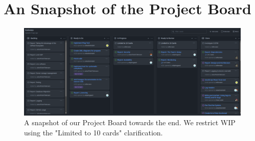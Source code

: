 \section{An Snapshot of the Project Board}
\label{app:kanbamps}

\begin{figure}[H]
    \centering
    \includegraphics[width=\textwidth]{images/Kanbamps.png}
    \caption{A snapshot of our Project Board towards the end. We restrict WIP using the "Limited to 10 cards" clarification.}
    \label{app:fig:kanbamps}
\end{figure}